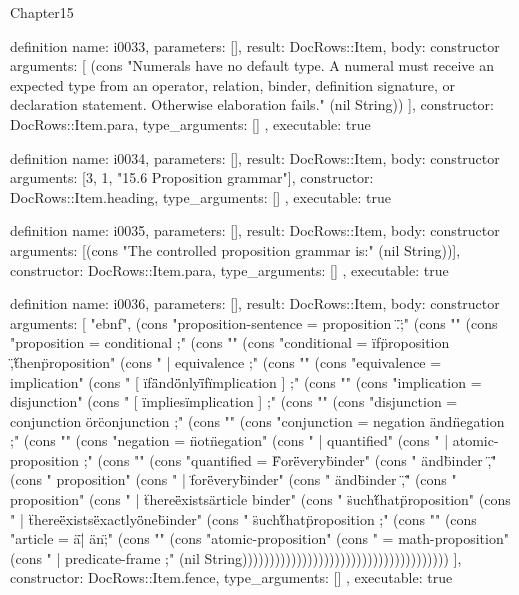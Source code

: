 \begin{lexlean}{Chapter15}
\begin{semanticmodule}
definition{
  name: i0033,
  parameters: [],
  result: DocRows::Item,
  body: constructor{
    arguments: [
      (cons "Numerals have no default type. A numeral must receive an expected type from an operator, relation, binder, definition signature, or declaration statement. Otherwise elaboration fails." (nil String))
    ],
    constructor: DocRows::Item.para,
    type_arguments: []
  },
  executable: true
}

definition{
  name: i0034,
  parameters: [],
  result: DocRows::Item,
  body: constructor{
    arguments: [3, 1, "15.6 Proposition grammar"],
    constructor: DocRows::Item.heading,
    type_arguments: []
  },
  executable: true
}

definition{
  name: i0035,
  parameters: [],
  result: DocRows::Item,
  body: constructor{
    arguments: [(cons "The controlled proposition grammar is:" (nil String))],
    constructor: DocRows::Item.para,
    type_arguments: []
  },
  executable: true
}

definition{
  name: i0036,
  parameters: [],
  result: DocRows::Item,
  body: constructor{
    arguments: [
      "ebnf",
      (cons "proposition-sentence = proposition \".\" ;" (cons "" (cons "proposition    = conditional ;" (cons "" (cons "conditional    = \"if\" proposition \",\" \"then\" proposition" (cons "               | equivalence ;" (cons "" (cons "equivalence    = implication" (cons "                 [ \"if\" \"and\" \"only\" \"if\" implication ] ;" (cons "" (cons "implication    = disjunction" (cons "                 [ \"implies\" implication ] ;" (cons "" (cons "disjunction    = conjunction { \"or\" conjunction } ;" (cons "" (cons "conjunction    = negation { \"and\" negation } ;" (cons "" (cons "negation       = \"not\" negation" (cons "               | quantified" (cons "               | atomic-proposition ;" (cons "" (cons "quantified     = \"For\" \"every\" binder" (cons "                 { \"and\" binder } \",\"" (cons "                 proposition" (cons "               | \"for\" \"every\" binder" (cons "                 { \"and\" binder } \",\"" (cons "                 proposition" (cons "               | \"there\" \"exists\" article binder" (cons "                 \"such\" \"that\" proposition" (cons "               | \"there\" \"exists\" \"exactly\" \"one\" binder" (cons "                 \"such\" \"that\" proposition ;" (cons "" (cons "article        = \"a\" | \"an\" ;" (cons "" (cons "atomic-proposition" (cons "              = math-proposition" (cons "              | predicate-frame ;" (nil String))))))))))))))))))))))))))))))))))))))
    ],
    constructor: DocRows::Item.fence,
    type_arguments: []
  },
  executable: true
}


\end{semanticmodule}
\end{lexlean}
